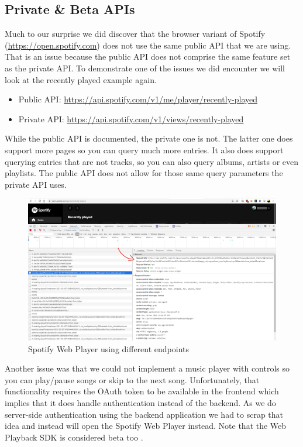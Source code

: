 \subsection{Private \& Beta APIs}

Much to our surprise we did discover that the browser variant of Spotify (\url{https://open.spotify.com}) does not use the same public API that we are using. That is an issue because the public API does not comprise the same feature set as the private API. To demonstrate one of the issues we did encounter we will look at the recently played example again.

\begin{itemize}
    \item Public API: \url{https://api.spotify.com/v1/me/player/recently-played}
    \item Private API: \url{https://api.spotify.com/v1/views/recently-played}
\end{itemize}

While the public API is documented, the private one is not. The latter one does support more pages so you can query much more entries. It also does support querying entries that are not tracks, so you can also query albums, artists or even playlists. The public API does not allow for those same query parameters the private API uses.

\begin{figure}[bth]
    \centering
    \includegraphics[width=1.0\textwidth]{Graphics/Chapter4/open-spotify-api.png}
    \caption{Spotify Web Player using different endpoints}
\end{figure}

Another issue was that we could not implement a music player with controls so you can play/pause songs or skip to the next song. Unfortunately, that functionality requires the OAuth token to be available in the frontend which implies that it does handle authentication instead of the backend. As we do server-side authentication using the backend application we had to scrap that idea and instead will open the Spotify Web Player instead. Note that the Web Playback \acs{SDK} is considered beta too \cite{SpotifyWebPlaybackSdk}.


